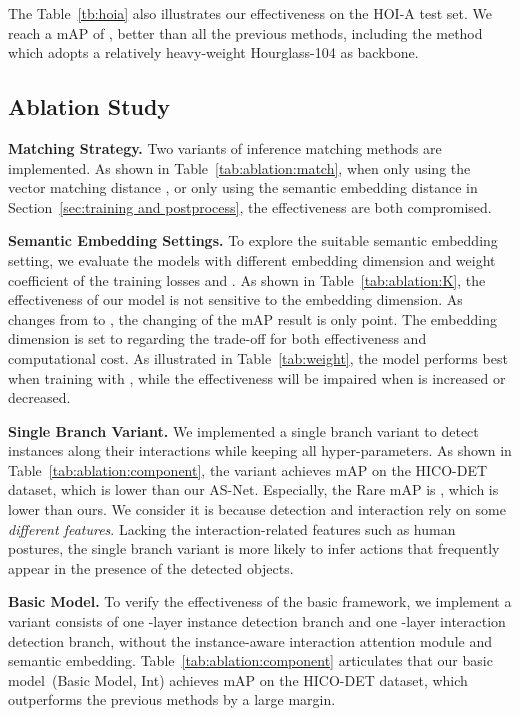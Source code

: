 \documentclass[final]{cvpr}
\begin{document}
The Table~\ref{tb:hoia} also illustrates our effectiveness on the HOI-A test set. We reach a mAP of , better than all the previous methods, including the method which adopts a relatively heavy-weight Hourglass-104 as backbone.
\vspace{-1.5mm}\subsection{Ablation Study}
\vspace{-0.5mm}
\noindent\textbf{Matching Strategy.}
Two variants of inference matching methods are implemented. As shown in Table~\ref{tab:ablation:match}, when only using the vector matching distance , or only using the semantic embedding distance  in Section~\ref{sec:training and postprocess}, the effectiveness are both compromised.

\vspace{0.5mm}\noindent\textbf{Semantic Embedding Settings.}
To explore the suitable semantic embedding setting, we evaluate the models with different embedding dimension  and weight coefficient  of the training losses  and  . As shown in Table~\ref{tab:ablation:K}, the effectiveness of our model is not sensitive to the embedding dimension. As  changes from  to , the changing of the mAP result is only  point. The embedding dimension  is set to  regarding the trade-off for both effectiveness and computational cost. As illustrated in Table~\ref{tab:weight}, the model performs best when training with , while the effectiveness will be impaired when  is increased or decreased.

\vspace{0.5mm}\noindent\textbf{Single Branch Variant.}
We implemented a single branch variant to detect instances along their interactions while keeping all hyper-parameters. As shown in Table~\ref{tab:ablation:component}, the variant achieves  mAP on the HICO-DET dataset, which is  lower than our AS-Net. Especially, the Rare mAP is , which is  lower than ours.  We consider it is because detection and interaction rely on some \textit{different features}. Lacking the interaction-related features such as human postures, the single branch variant is more likely to infer actions that frequently appear in the presence of the detected objects.

\vspace{0.5mm}\noindent\textbf{Basic Model.}
To verify the effectiveness of the basic framework, we implement a variant consists of one -layer instance detection branch and one -layer interaction detection branch, without the instance-aware interaction attention module and semantic embedding. Table~\ref{tab:ablation:component} articulates that our basic model~(Basic Model, Int) achieves  mAP on the HICO-DET dataset, which outperforms the previous methods by a large margin. 
\end{document}
